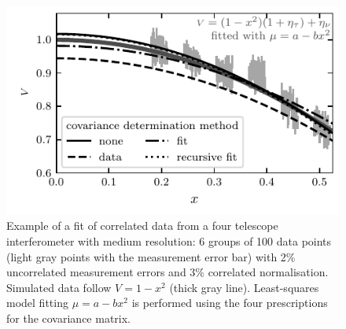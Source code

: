 \documentclass[a4paper,fleqn,usenatbib]{mnras}
\def\data{\ensuremath{{\scriptstyle V}}}
\def\mod{\ensuremath{\mu}}
\begin{document}
\begin{figure}
\centering
\includegraphics[width=\linewidth]{pdf/fit-example.pdf}
\caption{Example of a fit of correlated data from a four telescope interferometer with medium resolution: 6 groups of 100 data points (light gray points with the measurement error bar) with 2\% uncorrelated measurement errors and 3\% correlated normalisation.  Simulated data follow $\data = 1-x^2$ (thick gray line). Least-squares model fitting $\mod = a-bx^2$ is performed using the four prescriptions for the covariance matrix.}
\label{fig:fitexample}
\end{figure}
\end{document}
